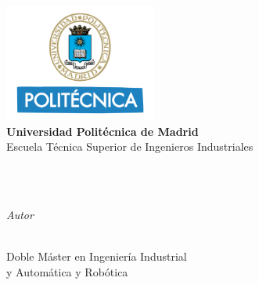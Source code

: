 %


\begin{titlepage}
	\tgherosfont
	\centering
	\includegraphics[width=5cm]{figuras/logos/logo_upm_crop.png} \\[1mm]
	{\Large \textbf{Universidad Politécnica de Madrid}}\\[1mm]
	{\large Escuela Técnica Superior de Ingenieros Industriales}\\[10mm]
	

	\hrulefill
	\vfill
    
	{\LARGE \MakeUppercase{\thesisSubject}} \\[5mm]
	{\Huge \color{ctcolortitle}\textbf{\thesisTitle} \\[10mm]}

	\begin{minipage}[t]{.27\textwidth}
		\raggedleft
		\textit{Autor}
	\end{minipage}
	\hspace*{15pt}
	\begin{minipage}[t]{.65\textwidth}
		{\Large \thesisName} \\
	  	{\small Doble Máster en Ingeniería Industrial \\y Automática y Robótica} \\[-1mm]
	\end{minipage} \\[5mm]
	\vfill
	\hrulefill
	

\end{titlepage}
